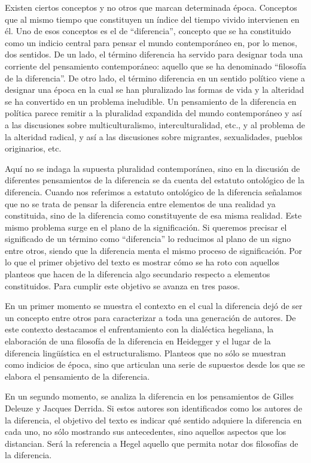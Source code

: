 Existen ciertos conceptos y no otros que marcan determinada época. Conceptos que al mismo tiempo que constituyen un índice del tiempo vivido intervienen en él. Uno de esos conceptos es el de \enquote{diferencia}, concepto que se ha constituido como un indicio central para pensar el mundo contemporáneo en, por lo menos, dos sentidos. De un lado, el término diferencia ha servido para designar toda una corriente del pensamiento contemporáneo: aquello que se ha denominado \enquote{filosofía de la diferencia}. De otro lado, el término diferencia en un sentido político viene a designar una época en la cual se han pluralizado las formas de vida y la alteridad se ha convertido en un problema ineludible. Un pensamiento de la diferencia en política parece remitir a la pluralidad expandida del mundo contemporáneo y así a las discusiones sobre multiculturalismo, interculturalidad, etc., y al problema de la alteridad radical, y así a las discusiones sobre migrantes, sexualidades, pueblos originarios, etc.

Aquí no se indaga la supuesta pluralidad contemporánea, sino en la discusión de diferentes pensamientos de la diferencia se da cuenta del estatuto ontológico de la diferencia. Cuando nos referimos a estatuto ontológico de la diferencia señalamos que no se trata de pensar la diferencia entre elementos de una realidad ya constituida, sino de la diferencia como constituyente de esa misma realidad. Este mismo problema surge en el plano de la significación. Si queremos precisar el significado de un término como \enquote{diferencia} lo reducimos al plano de un signo entre otros, siendo que la diferencia menta el mismo proceso de significación. Por lo que el primer objetivo del texto es mostrar cómo se ha roto con aquellos planteos que hacen de la diferencia algo secundario respecto a elementos constituidos. Para cumplir este objetivo se avanza en tres pasos.

En un primer momento se muestra el contexto en el cual la diferencia dejó de ser un concepto entre otros para caracterizar a toda una generación de autores. De este contexto destacamos el enfrentamiento con la dialéctica hegeliana, la elaboración de una filosofía de la diferencia en Heidegger y el lugar de la diferencia lingüística en el estructuralismo. Planteos que no sólo se muestran como indicios de época, sino que articulan una serie de supuestos desde los que se elabora el pensamiento de la diferencia.

En un segundo momento, se analiza la diferencia en los pensamientos de Gilles Deleuze y Jacques Derrida. Si estos autores son identificados como los autores de la diferencia, el objetivo del texto es indicar qué sentido adquiere la diferencia en cada uno, no sólo mostrando sus antecedentes, sino aquellos aspectos que los distancian. Será la referencia a Hegel aquello que permita notar dos filosofías de la diferencia.


